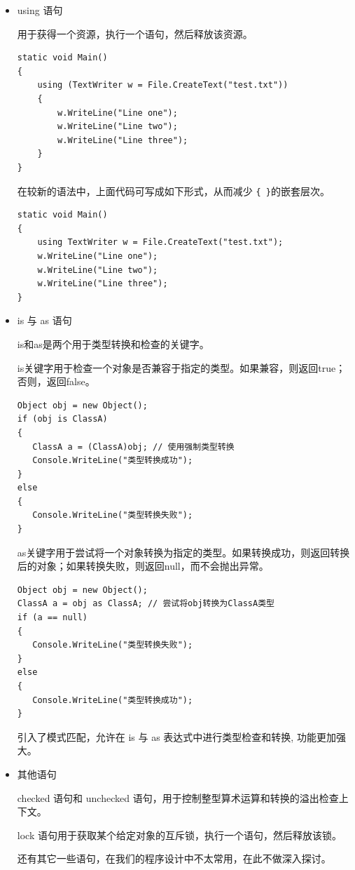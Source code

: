 \begin{itemize}
    \item using 语句

          用于获得一个资源，执行一个语句，然后释放该资源。

          \begin{lstlisting}
static void Main()
{
    using (TextWriter w = File.CreateText("test.txt"))
    {
        w.WriteLine("Line one");
        w.WriteLine("Line two");
        w.WriteLine("Line three");
    }
}
\end{lstlisting}

          在较新的语法中，上面代码可写成如下形式，从而减少 \verb|{ }|的嵌套层次。

          \begin{lstlisting}
static void Main()
{
    using TextWriter w = File.CreateText("test.txt");
    w.WriteLine("Line one");
    w.WriteLine("Line two");
    w.WriteLine("Line three");
}
\end{lstlisting}

    \item is 与 as 语句

          is和as是两个用于类型转换和检查的关键字。

          is关键字用于检查一个对象是否兼容于指定的类型。如果兼容，则返回true；否则，返回false。

          \begin{lstlisting}
Object obj = new Object();
if (obj is ClassA)
{
   ClassA a = (ClassA)obj; // 使用强制类型转换
   Console.WriteLine("类型转换成功");
}
else
{
   Console.WriteLine("类型转换失败");
}
\end{lstlisting}

          as关键字用于尝试将一个对象转换为指定的类型。如果转换成功，则返回转换后的对象；如果转换失败，则返回null，而不会抛出异常。

          \begin{lstlisting}
Object obj = new Object();
ClassA a = obj as ClassA; // 尝试将obj转换为ClassA类型
if (a == null)
{
   Console.WriteLine("类型转换失败");
}
else
{
   Console.WriteLine("类型转换成功");
}
\end{lstlisting}

           引入了模式匹配，允许在 is 与 as 表达式中进行类型检查和转换, 功能更加强大。

    \item 其他语句

          checked 语句和 unchecked 语句，用于控制整型算术运算和转换的溢出检查上下文。

          lock 语句用于获取某个给定对象的互斥锁，执行一个语句，然后释放该锁。

          还有其它一些语句，在我们的程序设计中不太常用，在此不做深入探讨。

\end{itemize}




